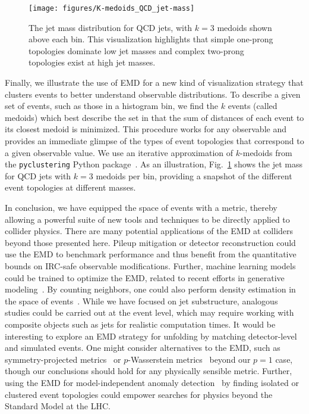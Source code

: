 \documentclass[aps,prl,twocolumn,preprintnumbers,nofootinbib,longbibliography,floatfix]{revtex4-1}
\DeclareRobustCommand{\Fig}[1]{Fig.~\ref{#1}}
\begin{document}
\begin{figure}[t]
\centering
\texttt{[image: figures/K-medoids\_QCD\_jet-mass]}
\caption{The jet mass distribution for QCD jets, with $k=3$ medoids shown above each bin.
%
This visualization highlights that simple one-prong topologies dominate low jet masses and complex two-prong topologies exist at high jet masses.}
\label{fig:medoids}
\end{figure}


Finally, we illustrate the use of EMD for a new kind of visualization strategy that clusters events to better understand observable distributions.
%
To describe a given set of events, such as those in a histogram bin, we find the $k$ events (called medoids) which best describe the set in that the sum of distances of each event to its closest medoid is minimized.
%
This procedure works for any observable and provides an immediate glimpse of the types of event topologies that correspond to a given observable value.
%
We use an iterative approximation of $k$-medoids from the {\tt pyclustering} Python package~\cite{andrei_novikov_2018_1491324}.
%
As an illustration, \Fig{fig:medoids} shows the jet mass for QCD jets with $k=3$ medoids per bin, providing a snapshot of the different event topologies at different masses.


In conclusion, we have equipped the space of events with a metric, thereby allowing a powerful suite of new tools and techniques to be directly applied to collider physics.
%
There are many potential applications of the EMD at colliders beyond those presented here.
%
Pileup mitigation or detector reconstruction could use the EMD to benchmark performance and thus benefit from the quantitative bounds on IRC-safe observable modifications.
%
Further, machine learning models could be trained to optimize the EMD, related to recent efforts in generative modeling~\cite{DBLP:journals/corr/ArjovskyCB17,Erdmann:2018kuh,Erdmann:2018jxd,Chekalina:2018hxi}.
%
By counting neighbors, one could also perform density estimation in the space of events~\cite{Andreassen:2018apy}.
%
While we have focused on jet substructure, analogous studies could be carried out at the event level, which may require working with composite objects such as jets for realistic computation times.
%
It would be interesting to explore an EMD strategy for unfolding by matching detector-level and simulated events.
%
One might consider alternatives to the EMD, such as symmetry-projected metrics~\cite{DBLP:conf/gsi/PeleT13} or $p$-Wasserstein metrics~\cite{wasserstein1969markov,dobrushin1970prescribing} beyond our $p=1$ case, though our conclusions should hold for any physically sensible metric.
%
Further, using the EMD for model-independent anomaly detection~\cite{Collins:2018epr,DeSimone:2018efk,Hajer:2018kqm,Heimel:2018mkt,Farina:2018fyg,Cerri:2018anq,Collins:2019jip} by finding isolated or clustered event topologies could empower searches for physics beyond the Standard Model at the LHC.
\end{document}
